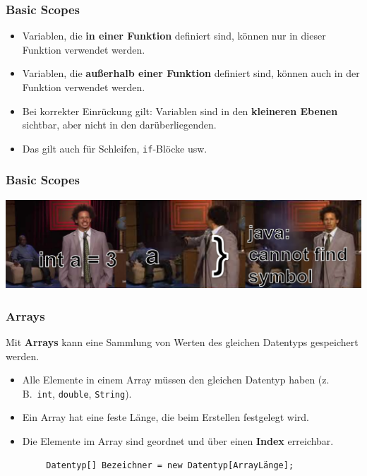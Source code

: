 \documentclass{../../presentation}
\begin{document}
\begin{frame}[fragile]
	\frametitle{Basic Scopes}
	\begin{itemize}
		\item Variablen, die \textbf{in einer Funktion} definiert sind, können nur in dieser Funktion verwendet werden.
		\item Variablen, die \textbf{außerhalb einer Funktion} definiert sind, können auch in der Funktion verwendet werden.
		\item Bei korrekter Einrückung gilt: Variablen sind in den \textbf{kleineren Ebenen} sichtbar, aber nicht in den darüberliegenden.
		\item Das gilt auch für Schleifen, \texttt{if}-Blöcke usw.
	\end{itemize}
\end{frame}

\begin{frame}[fragile]
	\frametitle{Basic Scopes}
	\includegraphics[width=1\linewidth]{img/scopesmemehoriz.png}
\end{frame}


\begin{frame}[fragile]
	\frametitle{Arrays}
	Mit \textbf{Arrays} kann eine Sammlung von Werten des gleichen Datentyps gespeichert werden.
	\begin{itemize}
		\item Alle Elemente in einem Array müssen den gleichen Datentyp haben (z.\,B.\ \texttt{int}, \texttt{double}, \texttt{String}).
		\item Ein Array hat eine feste Länge, die beim Erstellen festgelegt wird.
		\item Die Elemente im Array sind geordnet und über einen \textbf{Index} erreichbar.
	\end{itemize}
	\begin{verbatim}
        Datentyp[] Bezeichner = new Datentyp[ArrayLänge];
    \end{verbatim}
\end{frame}
\end{document}
